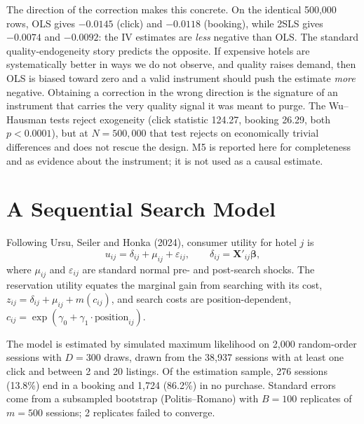 \documentclass[11pt]{article}
\begin{document}
The direction of the correction makes this concrete. On the identical 500,000
rows, OLS gives $-0.0145$ (click) and $-0.0118$ (booking), while 2SLS gives
$-0.0074$ and $-0.0092$: the IV estimates are \emph{less} negative than OLS.
The standard quality-endogeneity story predicts the opposite. If expensive
hotels are systematically better in ways we do not observe, and quality raises
demand, then OLS is biased toward zero and a valid instrument should push the
estimate \emph{more} negative. Obtaining a correction in the wrong direction is
the signature of an instrument that carries the very quality signal it was
meant to purge. The Wu--Hausman tests reject exogeneity (click statistic
124.27, booking 26.29, both $p<0.0001$), but at $N=500{,}000$ that test rejects
on economically trivial differences and does not rescue the design. M5 is
reported here for completeness and as evidence about the instrument; it is not
used as a causal estimate.

\section{A Sequential Search Model}

Following Ursu, Seiler and Honka (2024), consumer utility for hotel $j$ is
%
\begin{equation}
u_{ij} = \delta_{ij} + \mu_{ij} + \varepsilon_{ij},
\qquad \delta_{ij} = \mathbf{X}'_{ij}\boldsymbol{\beta},
\end{equation}
%
where $\mu_{ij}$ and $\varepsilon_{ij}$ are standard normal pre- and
post-search shocks. The reservation utility equates the marginal gain from
searching with its cost, $z_{ij} = \delta_{ij} + \mu_{ij} + m(c_{ij})$, and
search costs are position-dependent,
$c_{ij} = \exp(\gamma_0 + \gamma_1 \cdot \text{position}_{ij})$.

The model is estimated by simulated maximum likelihood on 2,000 random-order
sessions with $D = 300$ draws, drawn from the 38,937 sessions with at least one
click and between 2 and 20 listings. Of the estimation sample, 276 sessions
(13.8\%) end in a booking and 1,724 (86.2\%) in no purchase. Standard errors
come from a subsampled bootstrap (Politis--Romano) with $B = 100$ replicates of
$m = 500$ sessions; 2 replicates failed to converge.
\end{document}
